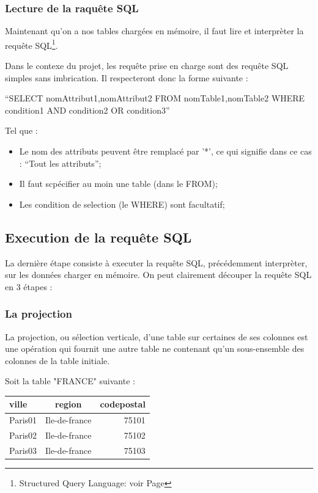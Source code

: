 \documentclass[oneside,13pt,a4paper]{report}
\begin{document}
\subsubsection{Lecture de la raquête SQL}

Maintenant qu'on a nos tables chargées en mémoire, il faut lire et interprèter la requête SQL\footnote{Structured Query Language: voir Page \pageref{sql}}.

Dans le contexe du projet, les requête prise en charge sont des requête SQL simples sans imbrication. Il respecteront donc la forme suivante :

\enquote{SELECT nomAttribut1,nomAttribut2 FROM nomTable1,nomTable2 WHERE condition1 AND condition2 OR condition3}

Tel que :
\begin{itemize}
	\item Le nom des attributs peuvent être remplacé par '*', ce qui signifie dans ce cas : \enquote{Tout les attributs};
	\item Il faut scpécifier au moin une table (dans le FROM);
	\item Les condition de selection (le WHERE) sont facultatif;
\end{itemize}
\vspace{0.3cm}


\subsection{Execution de la requête SQL}

La dernière étape consiste à executer la requête SQL, précédemment interprèter, sur les données charger en mémoire.
On peut clairement découper la requête SQL en 3 étapes :

\subsubsection{La projection}

La projection, ou sélection verticale, d'une table sur certaines de ses colonnes est une opération qui fournit une autre table ne contenant qu'un sous-ensemble des colonnes de la table initiale.

Soit la table "FRANCE" suivante :

\begin{tabular}{|l|c|r|}
	\hline
	ville   & region        & codepostal
	\\
	\hline
	Paris01 & Ile-de-france & 75101      \\
	Paris02 & Ile-de-france & 75102      \\
	Paris03 & Ile-de-france & 75103      \\
	\hline
\end{tabular}
\end{document}
